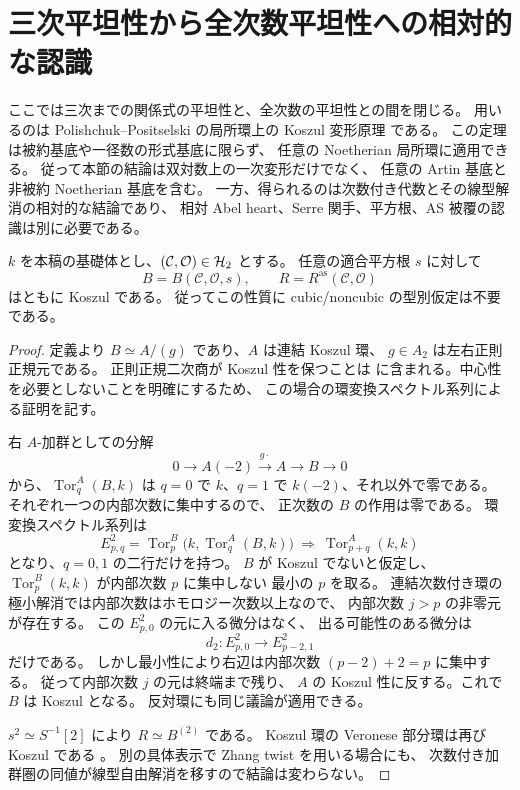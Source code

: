 \section{三次平坦性から全次数平坦性への相対的な認識}
\label{sec:relative-koszul}

ここでは三次までの関係式の平坦性と、全次数の平坦性との間を閉じる。
用いるのは Polishchuk--Positselski の局所環上の Koszul 変形原理
\cite[Chapter 6, Theorem 7.3]{PolishchukPositselski2005} である。
この定理は被約基底や一径数の形式基底に限らず、
任意の Noetherian 局所環に適用できる。
従って本節の結論は双対数上の一次変形だけでなく、
任意の Artin 基底と非被約 Noetherian 基底を含む。
一方、得られるのは次数付き代数とその線型解消の相対的な結論であり、
相対 Abel heart、Serre 関手、平方根、AS 被覆の認識は別に必要である。

\begin{proposition}
\label{prop:all-h2-antiserre-koszul}
$k$ を本稿の基礎体とし、$(\mathcal C,\mathcal O)\in\mathcal H_2$ とする。
任意の適合平方根 $s$ に対して
\[
 B=B(\mathcal C,\mathcal O,s),\qquad
 R=R^{\mathrm{as}}(\mathcal C,\mathcal O)
\]
はともに Koszul である。
従ってこの性質に cubic/noncubic の型別仮定は不要である。
\end{proposition}
\begin{proof}
定義より $B\simeq A/(g)$ であり、$A$ は連結 Koszul 環、
$g\in A_2$ は左右正則正規元である。
正則正規二次商が Koszul 性を保つことは
\cite[Chapter 2, Corollary 6.3]{PolishchukPositselski2005}
に含まれる。中心性を必要としないことを明確にするため、
この場合の環変換スペクトル系列による証明を記す。

右 $A$-加群としての分解
\[
 0\longrightarrow A(-2)\xrightarrow{\,g\cdot\,}A
 \longrightarrow B\longrightarrow0
\]
から、$\operatorname{Tor}^A_q(B,k)$ は
$q=0$ で $k$、$q=1$ で $k(-2)$、それ以外で零である。
それぞれ一つの内部次数に集中するので、
正次数の $B$ の作用は零である。
環変換スペクトル系列は
\[
 E^2_{p,q}
 =\operatorname{Tor}^B_p
       \bigl(k,\operatorname{Tor}^A_q(B,k)\bigr)
 \ \Longrightarrow\ \operatorname{Tor}^A_{p+q}(k,k)
\]
となり、$q=0,1$ の二行だけを持つ。
$B$ が Koszul でないと仮定し、
$\operatorname{Tor}^B_p(k,k)$ が内部次数 $p$ に集中しない
最小の $p$ を取る。
連結次数付き環の極小解消では内部次数はホモロジー次数以上なので、
内部次数 $j>p$ の非零元が存在する。
この $E^2_{p,0}$ の元に入る微分はなく、
出る可能性のある微分は
\[
 d_2:E^2_{p,0}\longrightarrow E^2_{p-2,1}
\]
だけである。
しかし最小性により右辺は内部次数 $(p-2)+2=p$ に集中する。
従って内部次数 $j$ の元は終端まで残り、
$A$ の Koszul 性に反する。これで $B$ は Koszul となる。
反対環にも同じ議論が適用できる。

$s^2\simeq S^{-1}[2]$ により $R\simeq B^{(2)}$ である。
Koszul 環の Veronese 部分環は再び Koszul である
\cite[Chapter 3, Proposition 2.2(i)]{PolishchukPositselski2005}。
別の具体表示で Zhang twist を用いる場合にも、
次数付き加群圏の同値が線型自由解消を移すので結論は変わらない。
\end{proof}

